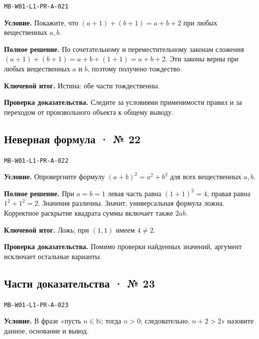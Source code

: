 \documentclass[11pt,a4paper,openany]{book}
\newcommand{\muid}[1]{\texttt{\footnotesize #1}}
\begin{document}
\muid{MB-W01-L1-PR-A-021}\par

\textbf{Условие.} Покажите, что $(a+1)+(b+1)=a+b+2$ при любых вещественных $a,b$.\par

\textbf{Полное решение.} По сочетательному и переместительному законам сложения $(a+1)+(b+1)=a+b+(1+1)=a+b+2$. Эти законы верны при любых вещественных $a$ и $b$, поэтому получено тождество.


\begin{learnbox}\textbf{Ключевой итог.} Истина: обе части тождественны.\par \textbf{Проверка доказательства.} 
Следите за условиями применимости правил и за переходом от произвольного объекта к общему выводу. 
\end{learnbox}

\subsection*{Неверная формула · № 22}\hypertarget{solution:MB-W01-L1-PR-A-022}{}

\muid{MB-W01-L1-PR-A-022}\par

\textbf{Условие.} Опровергните формулу $(a+b)^2=a^2+b^2$ для всех вещественных $a,b$.\par

\textbf{Полное решение.} При $a=b=1$ левая часть равна $(1+1)^2=4$, правая равна $1^2+1^2=2$. Значения различны. Значит, универсальная формула ложна. Корректное раскрытие квадрата суммы включает также $2ab$.


\begin{learnbox}\textbf{Ключевой итог.} Ложь; при $(1,1)$ имеем $4\ne2$.\par \textbf{Проверка доказательства.} 
Помимо проверки найденных значений, аргумент исключает остальные варианты. 
\end{learnbox}

\subsection*{Части доказательства · № 23}\hypertarget{solution:MB-W01-L1-PR-A-023}{}

\muid{MB-W01-L1-PR-A-023}\par

\textbf{Условие.} В фразе «пусть $n\in\mathbb N$; тогда $n>0$; следовательно, $n+2>2$» назовите данное, основание и вывод.\par
\end{document}
